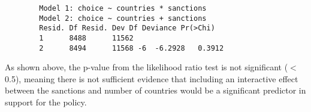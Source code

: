 \documentclass[12pt,letterpaper]{article}
\begin{document}
\begin{enumerate}
\begin{enumerate}
\begin{Verbatim}
		Model 1: choice ~ countries * sanctions
		Model 2: choice ~ countries + sanctions
		Resid. Df Resid. Dev Df Deviance Pr(>Chi)
		1      8488      11562                     
		2      8494      11568 -6  -6.2928   0.3912
	\end{Verbatim}
	\noindent As shown above, the p-value from the likelihood ratio test is not significant ($<$ 0.5), meaning there is not sufficient evidence that including an interactive effect between the sanctions and number of countries would be a significant predictor in support for the policy.
	\end{enumerate}
	\end{enumerate}
\end{document}
